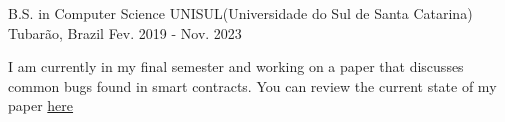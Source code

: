 

\begin{cventries}

  \cventry
    {B.S. in Computer Science} %
    {UNISUL(Universidade do Sul de Santa Catarina)} %
    {Tubarão, Brazil} %
    {Fev. 2019 - Nov. 2023} %
    {
      \begin{cvitems} %
        \item {I am currently in my final semester and working on a paper that discusses common bugs found in smart contracts. You can review the current state of my paper
          \href{https://github.com/anajuliabit/solidity-common-vulnerabilities}{here}
        }
      \end{cvitems}
    }

\end{cventries}
